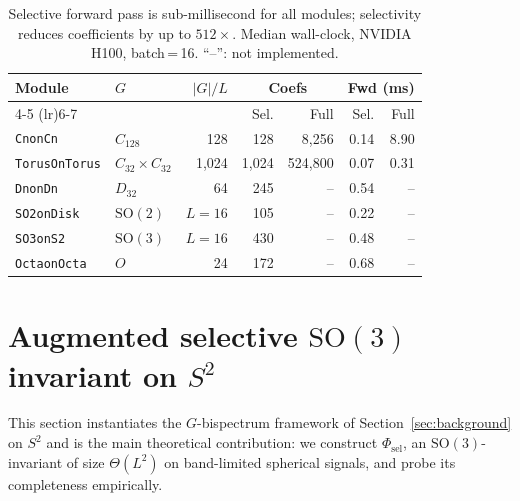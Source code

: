\documentclass{article}
\theoremstyle{definition}
\theoremstyle{remark}
\newcommand{\SO}{\mathrm{SO}}
\theoremstyle{definition}
\begin{document}
\begin{table}[tbp]
  \centering
  \caption{Selective forward pass is sub-millisecond for all modules;
    selectivity reduces coefficients by up to $512\times$.
    Median wall-clock, NVIDIA H100, batch\,=\,16.
    ``--'': not implemented.}
  \label{tab:benchmarks}
  \small
  \setlength{\tabcolsep}{3.5pt}
  \begin{tabular*}{\linewidth}{@{\extracolsep{\fill}}llrrrrr@{}}
    \toprule
    Module & $G$ & $|G|/L$ & \multicolumn{2}{c}{Coefs} & \multicolumn{2}{c}{Fwd (ms)} \\
    \cmidrule(lr){4-5} \cmidrule(lr){6-7}
     & & & Sel. & Full & Sel. & Full \\
    \midrule
    \texttt{CnonCn} & $C_{128}$ & 128 & 128 & 8{,}256 & 0.14 & 8.90 \\
    \texttt{TorusOnTorus} & $C_{32}{\times}C_{32}$ & 1{,}024 & 1{,}024 & 524{,}800 & 0.07 & 0.31 \\
    \texttt{DnonDn} & $D_{32}$ & 64 & 245 & -- & 0.54 & -- \\
    \texttt{SO2onDisk} & $\mathrm{SO}(2)$ & $L{=}16$ & 105 & -- & 0.22 & -- \\
    \texttt{SO3onS2} & $\mathrm{SO}(3)$ & $L{=}16$ & 430 & -- & 0.48 & -- \\
    \texttt{OctaonOcta} & $O$ & 24 & 172 & -- & 0.68 & -- \\
    \bottomrule
  \end{tabular*}
\end{table}



\section{Augmented selective $\SO(3)$ invariant on $S^2$}
\label{sec:so3-selective}

This section instantiates the $G$-bispectrum framework of
Section~\ref{sec:background} on $S^2$ and is the main theoretical
contribution: we construct $\Phi_{\mathrm{sel}}$, an
$\SO(3)$-invariant of size $\Theta(L^2)$ on band-limited spherical
signals, and probe its completeness empirically.
\end{document}
